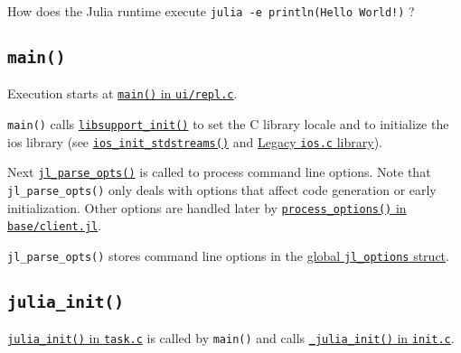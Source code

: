 How does the Julia runtime execute \texttt{julia -e {\textquotesingle}println({\textquotedbl}Hello World!{\textquotedbl}){\textquotesingle}} ?



\hypertarget{6651980781302015874}{}


\subsection{\texttt{main()}}



Execution starts at \href{https://github.com/JuliaLang/julia/blob/master/ui/repl.c}{\texttt{main()} in \texttt{ui/repl.c}}.



\texttt{main()} calls \href{https://github.com/JuliaLang/julia/blob/master/src/support/libsupportinit.c}{\texttt{libsupport\_init()}} to set the C library locale and to initialize the {\textquotedbl}ios{\textquotedbl} library (see \href{https://github.com/JuliaLang/julia/blob/master/src/support/ios.c}{\texttt{ios\_init\_stdstreams()}} and \hyperlink{3841537160196121279}{Legacy \texttt{ios.c} library}).



Next \href{https://github.com/JuliaLang/julia/blob/master/src/jloptions.c}{\texttt{jl\_parse\_opts()}} is called to process command line options. Note that \texttt{jl\_parse\_opts()} only deals with options that affect code generation or early initialization. Other options are handled later by \href{https://github.com/JuliaLang/julia/blob/master/base/client.jl}{\texttt{process\_options()} in \texttt{base/client.jl}}.



\texttt{jl\_parse\_opts()} stores command line options in the \href{https://github.com/JuliaLang/julia/blob/master/src/julia.h}{global \texttt{jl\_options} struct}.



\hypertarget{10951200599627901176}{}


\subsection{\texttt{julia\_init()}}



\href{https://github.com/JuliaLang/julia/blob/master/src/task.c}{\texttt{julia\_init()} in \texttt{task.c}} is called by \texttt{main()} and calls \href{https://github.com/JuliaLang/julia/blob/master/src/init.c}{\texttt{\_julia\_init()} in \texttt{init.c}}.



